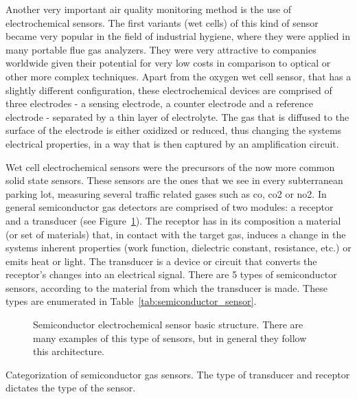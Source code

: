 Another very important air quality monitoring method is the use of
electrochemical sensors. The first variants (wet cells) of this kind of
sensor became very popular in the field of industrial hygiene, where
they were applied in many portable flue gas analyzers. They were very
attractive to companies worldwide given their potential for very low
costs in comparison to optical or other more complex techniques. Apart
from the oxygen wet cell sensor, that has a slightly different
configuration, these electrochemical devices are comprised of three
electrodes - a sensing electrode, a counter electrode and a reference
electrode - separated by a thin layer of electrolyte. The gas that is
diffused to the surface of the electrode is either oxidized or reduced,
thus changing the systems electrical properties, in a way that is then
captured by an amplification circuit.

Wet cell electrochemical sensors were the precursors of the now more
common solid state sensors. These sensors are the ones that we see in
every subterranean parking lot, measuring several traffic related gases
such as \gls{co}, \gls{co2} or \gls{no2}. In general semiconductor gas
detectors are comprised of two modules: a receptor and a transducer (see
Figure~\ref{fig:semiconductor_sensor}). The receptor has in its
composition a material (or set of materials) that, in contact with the
target gas, induces a change in the systems inherent properties (work
function, dielectric constant, resistance, etc.) or emits heat or light.
The transducer is a device or circuit that converts the receptor's
changes into an electrical signal. There are 5 types of semiconductor
sensors, according to the material from which the transducer is made.
These types are enumerated in Table~\ref{tab:semiconductor_sensor}.

\begin{figure}[htpb]
    \centering
    \missingfigure{}
    \caption{Semiconductor electrochemical sensor basic structure. There
    are many examples of this type of sensors, but in general they
    follow this architecture.}
    \label{fig:semiconductor_sensor}
\end{figure}

\begin{table}[htpb]
    \centering
    \caption{Categorization of semiconductor gas sensors. The type of
    transducer and receptor dictates the type of the sensor.}
    \label{tab:semiconductor_sensor}
\end{table}

